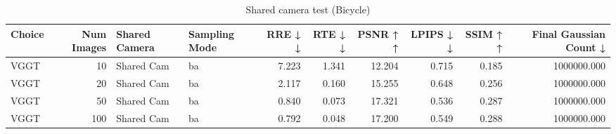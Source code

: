 \begin{table}[H]
\caption{Shared camera test (Bicycle)}
\label{tab:99_shared_camera_bicycle}
\begin{tabular}{lrllrrrrrr}
\toprule
Choice & Num Images & Shared Camera & Sampling Mode & RRE ↓ ↓ & RTE ↓ ↓ & PSNR ↑ ↑ & LPIPS ↓ ↓ & SSIM ↑ ↑ & Final Gaussian Count ↓ \\
\midrule
VGGT & 10 & Shared Cam & ba & 7.223 & 1.341 & 12.204 & 0.715 & 0.185 & 1000000.000 \\
VGGT & 20 & Shared Cam & ba & 2.117 & 0.160 & 15.255 & 0.648 & 0.256 & 1000000.000 \\
VGGT & 50 & Shared Cam & ba & 0.840 & 0.073 & 17.321 & 0.536 & 0.287 & 1000000.000 \\
VGGT & 100 & Shared Cam & ba & 0.792 & 0.048 & 17.200 & 0.549 & 0.288 & 1000000.000 \\
\bottomrule
\end{tabular}
\end{table}
